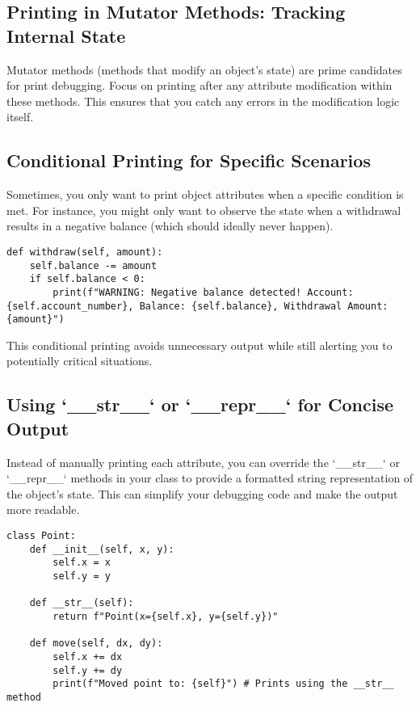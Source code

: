 \documentclass{article}
\begin{document}
{{{\subsection*{Printing in Mutator Methods: Tracking Internal State}

Mutator methods (methods that modify an object's state) are prime candidates for print debugging. Focus on printing after any attribute modification within these methods. This ensures that you catch any errors in the modification logic itself.

\subsection*{Conditional Printing for Specific Scenarios}

Sometimes, you only want to print object attributes when a specific condition is met.  For instance, you might only want to observe the state when a withdrawal results in a negative balance (which should ideally never happen).

\begin{verbatim}
def withdraw(self, amount):
    self.balance -= amount
    if self.balance < 0:
        print(f"WARNING: Negative balance detected! Account: {self.account_number}, Balance: {self.balance}, Withdrawal Amount: {amount}")
\end{verbatim}

This conditional printing avoids unnecessary output while still alerting you to potentially critical situations.

\subsection*{Using `__str__` or `__repr__` for Concise Output}

Instead of manually printing each attribute, you can override the `__str__` or `__repr__` methods in your class to provide a formatted string representation of the object's state. This can simplify your debugging code and make the output more readable.

\begin{verbatim}
class Point:
    def __init__(self, x, y):
        self.x = x
        self.y = y

    def __str__(self):
        return f"Point(x={self.x}, y={self.y})"

    def move(self, dx, dy):
        self.x += dx
        self.y += dy
        print(f"Moved point to: {self}") # Prints using the __str__ method
\end{verbatim}

}}}
\end{document}

